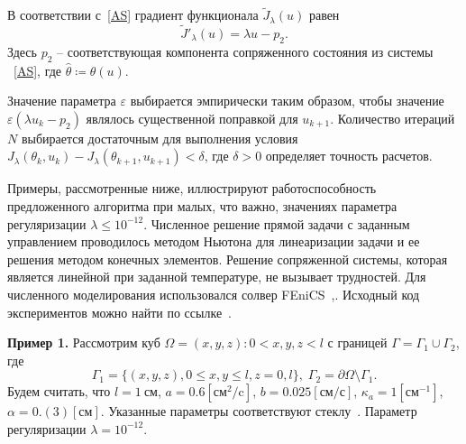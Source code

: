 В соответствии с~\eqref{AS} градиент функционала $\tilde J_\lambda(u)$ равен
\[ \tilde J'_\lambda (u) = \lambda u - p_2. \]
Здесь $p_2$ -- соответствующая компонента сопряженного состояния из системы ~\eqref{AS},
где $\hat{\theta}\coloneqq\theta(u)$.

Значение параметра $\varepsilon$ выбирается эмпирически таким образом, чтобы значение
$\varepsilon (\lambda u_k - p_2)$ являлось существенной поправкой для $u_{k+1}$.
Количество итераций $N$ выбирается достаточным для выполнения условия
$J_\lambda(\theta_k, u_k) - J_\lambda(\theta_{k+1}, u_{k+1}) < \delta$, где $\delta>0$
определяет точность расчетов.

Примеры, рассмотренные ниже, иллюстрируют работоспособность предложенного алгоритма при малых, что важно, значениях параметра регуляризации $\lambda \leq 10^{-12}$.
Численное решение прямой задачи с заданным управлением проводилось
методом Ньютона для линеаризации задачи и ее решения методом конечных элементов.
Решение сопряженной системы, которая является линейной при заданной температуре, не вызывает трудностей.
Для численного моделирования использовался солвер FEniCS~\cite{fenics},\cite{dolfin}.
Исходный код экспериментов можно найти по ссылке~\cite{mesenev-github}.

\textbf{Пример 1.}
Рассмотрим куб $\Omega = {(x, y, z): 0 < x,y,z < l}$ с границей $\Gamma = \Gamma_1 \cup \Gamma_2$, где
\[
    \Gamma_1 = \{(x, y, z), 0 \leq x,y \leq l, z= 0, l\}, \;
    \Gamma_2 = \partial \Omega \setminus \Gamma_1.
\]
Будем считать, что
$l = 1~\text{см}$,
$a = 0.6[\text{см}^2/\text{c}]$,
$b = 0.025[\text{см}/\text{с}]$,
$\kappa_a = 1[\text{см}^{-1}]$,
$\alpha = 0.(3)[\text{см}]$.
Указанные параметры соответствуют стеклу~\cite{Grenkin5}.
Параметр регуляризации $\lambda=10^{-12}$.

